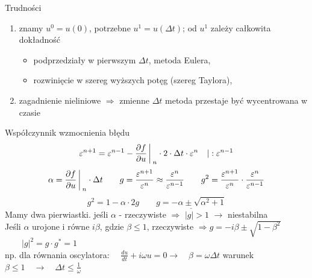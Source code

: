 \begin{frame}{Trudności}
	\begin{enumerate}
      \item znamy $u^0 = u(0)$, potrzebne $u^1 = u(\Delta t)$; od $u^1$ zależy całkowita dokładność
          \begin{itemize}
            \item podprzedziały w pierwszym $\Delta t$, metoda Eulera,
            \item rozwinięcie w szereg wyższych potęg (szereg Taylora),
          \end{itemize}
      \item zagadnienie nieliniowe $\Rightarrow$ zmienne $\Delta t$ \quad metoda przestaje być wycentrowana w czasie
    \end{enumerate}
\end{frame}
\begin{frame}{Współczynnik wzmocnienia błędu}
	$$\varepsilon^{n+1} = \varepsilon^{n-1} - \frac{\partial f}{\partial u} \bigg\arrowvert _n \cdot 2 \cdot \Delta t \cdot \varepsilon^n \quad \arrowvert :\varepsilon^{n-1}$$
    $$\alpha = \frac{\partial f}{\partial u}\bigg\arrowvert_n \cdot \Delta t \qquad g = \frac{\varepsilon^{n+1}}{\varepsilon^n} \approx \frac{\varepsilon^{n}}{\varepsilon^{n-1}} \qquad g^2=\frac{\varepsilon^{n+1}}{\varepsilon^n}\cdot \frac{\varepsilon^{n}}{\varepsilon^{n-1}}$$
    $$g^2 = 1- \alpha \cdot 2g \qquad \underline{g = -\alpha \pm \sqrt{\alpha^2+1}}$$
    Mamy dwa pierwiastki. \newline
    jeśli $\alpha$ - rzeczywiste $\Rightarrow$ \quad $|g| > 1$ \quad $\rightarrow$ niestabilna\\
    
    Jeśli  $\alpha$ urojone i równe $i\beta$, gdzie $\beta \leqslant 1$, rzeczywiste  
    $\Rightarrow g = -i\beta\pm\sqrt{1-\beta^2}$
    $\qquad |g|^2 = g \cdot g^* = 1 $\\
    np. dla równania oscylatora: $\quad \frac{du}{dt}+i\omega u = 0 \rightarrow \quad \beta = \omega\Delta t $ warunek $\beta \leqslant 1 \quad \rightarrow \quad \Delta t \leqslant\frac{1}{\omega}$
\end{frame}

